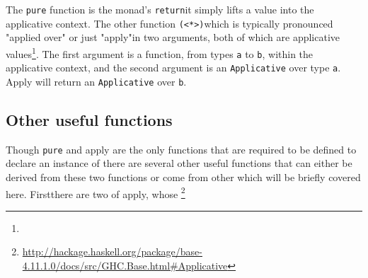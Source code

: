 The \texttt{pure} function is the \DIFdelbegin {}\DIFdelend \DIFaddbegin {}\DIFaddend monad's \texttt{return}\DIFdelbegin \DIFdel{, }\DIFdelend \DIFaddbegin \DIFadd{: }\DIFaddend it simply lifts a value into the applicative context. The other function \texttt{(<*>)}\DIFdelbegin \DIFdel{(}\DIFdelend \DIFaddbegin \DIFadd{, }\DIFaddend which is typically pronounced "applied over" or just "apply"\DIFdelbegin {}\DIFdelend \DIFaddbegin {}\DIFaddend in two arguments, both of which are applicative values\DIFaddbegin \footnote{}\DIFaddend . The first argument is a function, from types \texttt{a} to \texttt{b}, within the applicative context, and the second argument is an \texttt{Applicative} over type \texttt{a}. Apply will return an \texttt{Applicative} over \texttt{b}.

\subsection{Other useful functions}
\label{sec:useful}
Though \texttt{pure} and apply are the only \DIFdelbegin {}\DIFdelend functions that are required to be defined to declare an instance of \DIFdelbegin {}\DIFdelend \DIFaddbegin \texttt{} \DIFaddend there are several other useful functions that can either be derived from these two functions or come from other \DIFdelbegin {}\DIFdelend \DIFaddbegin {}\DIFaddend which will be briefly covered here. First\DIFaddbegin \DIFadd{, }\DIFaddend there are two \DIFdelbegin {}\DIFdelend \DIFaddbegin {}\DIFaddend of apply, whose \DIFdelbegin {}\DIFdelend \DIFaddbegin {}\footnote{\texttt{} \texttt{\DIFadd{(<\$)}} \texttt{} \url{http://hackage.haskell.org/package/base-4.11.1.0/docs/src/GHC.Base.html\#Applicative}}
\DIFaddend 

